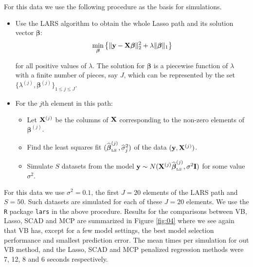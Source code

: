 \documentclass[11pt]{article}
\newtheorem{Main Result}{Main Result}
\def\vectorfontone{\bf}
\def\vectorfonttwo{\boldsymbol}
\def\vy{{\vectorfontone y}}                      %
\def\vbeta{{\vectorfonttwo \beta}}               %
\def\matrixfontone{\bf}
\def\mI{{\matrixfontone I}}                      %
\def\mX{{\matrixfontone X}}                      %
\begin{document}
For this data we use the following procedure as the basis for simulations.
\begin{itemize}
\item Use the LARS algorithm to obtain the whole Lasso path and its
solution vector $\vbeta$:
$$
\min_{\vbeta} \left\{ \|\vy - \mX\vbeta\|_2^2 + \lambda \| \vbeta\|_1 \right\}
$$

\noindent for all positive values of $\lambda$. The solution for $\vbeta$ is
a piecewise function of $\lambda$ with a finite number of pieces, say $J$,
which can be represented by the set $\{\lambda^{(j)},\vbeta^{(j)}\}_{1\le j\le J}$.

\item For the $j$th element in this path:
\begin{itemize}
\item Let $\mX^{(j)}$ be the columns of $\mX$ corresponding to the non-zero
elements of $\vbeta^{(j)}$.

\item Find the least squares fit $(\widehat{\vbeta}_{\mbox{\tiny LS}}^{(j)},\widehat{\sigma}_j^2)$
of the data $(\vy,\mX^{(j)})$.

\item Simulate $S$ datasets from the model
$\vy \sim N(\mX^{(j)}\widehat{\vbeta}_{\mbox{\tiny LS}}^{(j)},\sigma^2\mI)$
for some value $\sigma^2$.
\end{itemize}
\end{itemize}

\noindent For this data we use $\sigma^2=0.1$, the first $J=20$ elements of the
LARS path and $S=50$. Such datasets are simulated for each of these $J=20$ elements.
We use the {\tt R} package {\tt lars} \citep{LARS} in the above procedure.
Results for the comparisons between VB, Lasso, SCAD and MCP
are summarized in Figure \ref{fig:04} where we see again that VB has,
except for a few model settings, the best model selection performance and
smallest prediction error. The mean times per simulation for out VB method,
and the Lasso, SCAD and MCP penalized regression methods were 7, 12, 8 and 6 seconds respectively.



\end{document}
